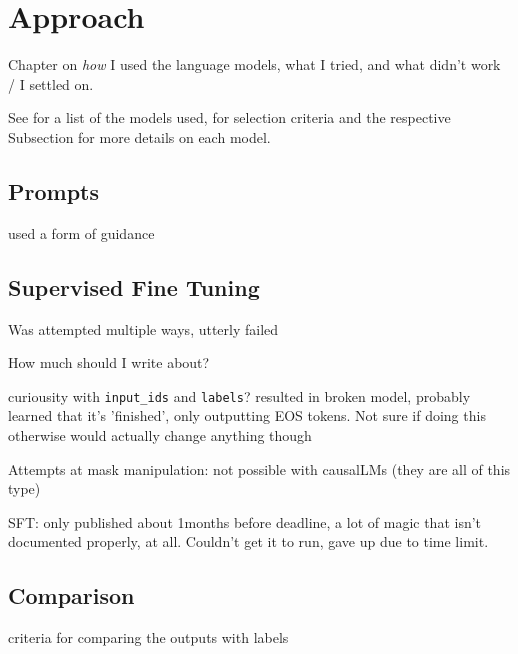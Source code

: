 \chapter{Approach}\label{chap:approach}
Chapter on {\em how} I used the language models, what I tried, and what didn't work / I settled on.

See  for a list of the models used,  for selection criteria and the respective Subsection for more details on each model.

\section{Prompts}\label{sec:prompts}

used a form of guidance \cite{guidance_2023}

\section{Supervised Fine Tuning}\label{sec:sft}
Was attempted multiple ways, utterly failed

How much should I write about?

curiousity with \verb`input_ids` and \verb`labels`? resulted in broken model, probably learned that it's 'finished', only outputting EOS tokens. Not sure if doing this otherwise would actually change anything though

Attempts at mask manipulation: not possible with causalLMs (they are all of this type)

SFT: only published about 1months before deadline, a lot of magic that isn't documented properly, at all. Couldn't get it to run, gave up due to time limit.

\section{Comparison}
criteria for comparing the outputs with labels
